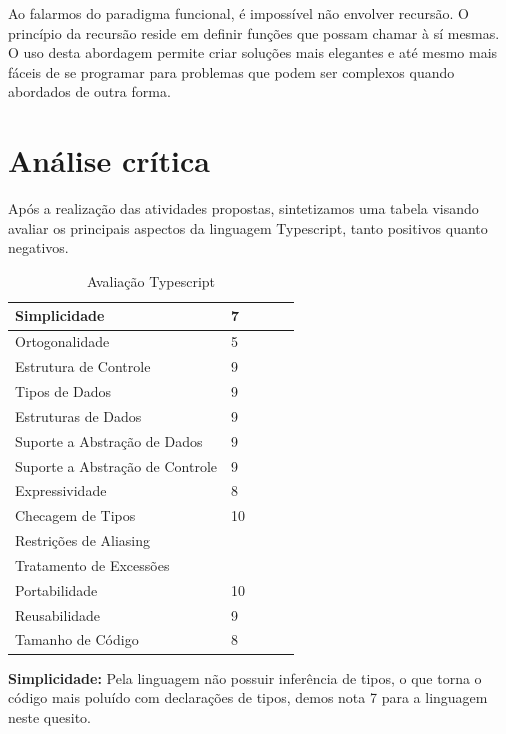 \documentclass[rel_mlp]{iiufrgs}
\numberwithin{figure}{chapter}
\begin{document}
Ao falarmos do paradigma funcional, é impossível não envolver recursão. O princípio da recursão reside em definir funções que possam chamar à sí mesmas. O uso desta abordagem permite criar soluções mais elegantes e até mesmo mais fáceis de se programar para problemas que podem ser complexos quando abordados de outra forma.


%
\chapter{Análise crítica}

Após a realização das atividades propostas, sintetizamos uma tabela visando avaliar os principais aspectos da linguagem Typescript, tanto positivos quanto negativos.

\begin{table}[h]
\centering
\caption{Avaliação Typescript}
\label{aval}
\begin{tabular}{|l|l|l|l|l|}
\hline
Simplicidade          			&  7	&  \\ \hline
Ortogonalidade        			&  5	&  \\ \hline
Estrutura de Controle 			&  9	&  \\ \hline
Tipos de Dados        			&  9	&  \\ \hline
Estruturas de Dados   			&  9	&  \\ \hline
Suporte a Abstração de Dados    &  9	&  \\ \hline
Suporte a Abstração de Controle	&  9	&  \\ \hline
Expressividade        			&  8	&  \\ \hline
Checagem de Tipos     			&  10	&  \\ \hline
Restrições de Aliasing        	&  		&  \\ \hline
Tratamento de Excessões 		&  		&  \\ \hline
Portabilidade        			&  10	&  \\ \hline
Reusabilidade          			&  9	&  \\ \hline
Tamanho de Código        		&  8	&  \\ \hline
\end{tabular}
\end{table}

\textbf{Simplicidade:} Pela linguagem não possuir inferência de tipos, o que torna o código mais poluído com declarações de tipos, demos nota 7 para a linguagem neste quesito.
\end{document}
